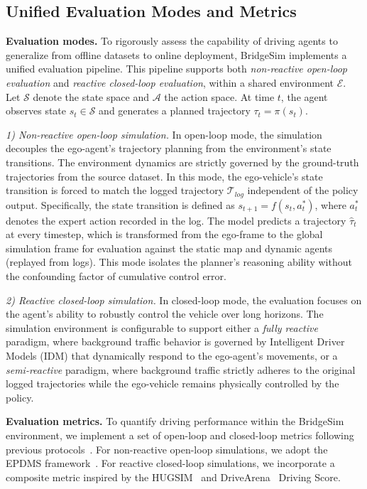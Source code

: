 \documentclass{article}
\begin{document}
\subsection{Unified Evaluation Modes and Metrics}
\label{appendix:eval_metrics}
\textbf{Evaluation modes.} To rigorously assess the capability of driving agents to generalize from offline datasets to online deployment, BridgeSim implements a unified evaluation pipeline. This pipeline supports both \textit{non-reactive open-loop evaluation} and \textit{reactive closed-loop evaluation}, within a shared environment $\mathcal{E}$. Let $\mathcal{S}$ denote the state space and $\mathcal{A}$ the action space. At time $t$, the agent observes state $s_t \in \mathcal{S}$ and generates a planned trajectory $\tau_t = \pi(s_t)$.

\textit{1) Non-reactive open-loop simulation. }  In open-loop mode, the simulation decouples the ego-agent's trajectory planning from the environment's state transitions. The environment dynamics are strictly governed by the ground-truth trajectories from the source dataset. In this mode, the ego-vehicle's state transition is forced to match the logged trajectory $\mathcal{T}_{log}$ independent of the policy output. Specifically, the state transition is defined as $s_{t+1} = f(s_t, a^*_{t})$, where $a^*_t$ denotes the expert action recorded in the log. The model predicts a trajectory $\hat{\tau}_t$ at every timestep, which is transformed from the ego-frame to the global simulation frame for evaluation against the static map and dynamic agents (replayed from logs). This mode isolates the planner's reasoning ability without the confounding factor of cumulative control error.

\textit{2) Reactive closed-loop simulation. } In closed-loop mode, the evaluation focuses on the agent's ability to robustly control the vehicle over long horizons. The simulation environment is configurable to support either a \textit{fully reactive} paradigm, where background traffic behavior is governed by Intelligent Driver Models (IDM) that dynamically respond to the ego-agent's movements, or a \textit{semi-reactive} paradigm, where background traffic strictly adheres to the original logged trajectories while the ego-vehicle remains physically controlled by the policy.

\textbf{Evaluation metrics.} To quantify driving performance within the BridgeSim environment, we implement a set of open-loop and closed-loop metrics following previous protocols~\cite{navsimv1, navsimv2, zhou2024hugsim, yang2024drivearena, li2025hydra-mdp++}. For non-reactive open-loop simulations, we adopt the EPDMS framework~\cite{navsimv1, navsimv2, li2025hydra-mdp++}. For reactive closed-loop simulations, we incorporate a composite metric inspired by the HUGSIM~\cite{zhou2024hugsim} and DriveArena~\cite{yang2024drivearena} Driving Score. 
\end{document}
